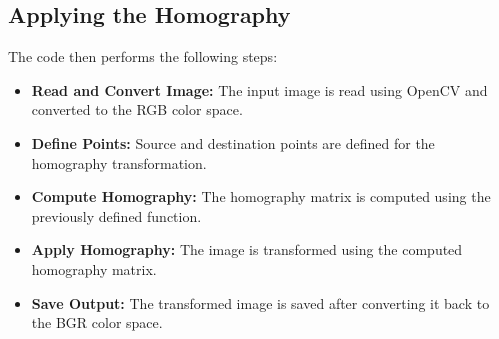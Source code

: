 \documentclass{article}
\begin{document}
\subsection*{Applying the Homography}

The code then performs the following steps:

\begin{itemize}
    \item \textbf{Read and Convert Image:} The input image is read using OpenCV and converted to the RGB color space.
    \item \textbf{Define Points:} Source and destination points are defined for the homography transformation.
    \item \textbf{Compute Homography:} The homography matrix is computed using the previously defined function.
    \item \textbf{Apply Homography:} The image is transformed using the computed homography matrix.
    \item \textbf{Save Output:} The transformed image is saved after converting it back to the BGR color space.
\end{itemize}
\end{document}
